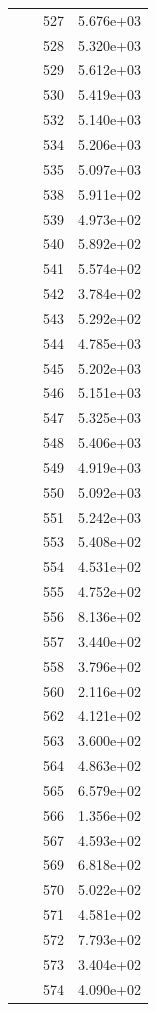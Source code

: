 \documentclass[12pt]{article}
\begin{document}
\begin{longtable}{@{}cccc@{}}
 &  & 527 & 5.676e+03 \\
 &  & 528 & 5.320e+03 \\
 &  & 529 & 5.612e+03 \\
 &  & 530 & 5.419e+03 \\
 &  & 532 & 5.140e+03 \\
 &  & 534 & 5.206e+03 \\
 &  & 535 & 5.097e+03 \\
 &  & 538 & 5.911e+02 \\
 &  & 539 & 4.973e+02 \\
 &  & 540 & 5.892e+02 \\
 &  & 541 & 5.574e+02 \\
 &  & 542 & 3.784e+02 \\
 &  & 543 & 5.292e+02 \\
 &  & 544 & 4.785e+03 \\
 &  & 545 & 5.202e+03 \\
 &  & 546 & 5.151e+03 \\
 &  & 547 & 5.325e+03 \\
 &  & 548 & 5.406e+03 \\
 &  & 549 & 4.919e+03 \\
 &  & 550 & 5.092e+03 \\
 &  & 551 & 5.242e+03 \\
 &  & 553 & 5.408e+02 \\
 &  & 554 & 4.531e+02 \\
 &  & 555 & 4.752e+02 \\
 &  & 556 & 8.136e+02 \\
 &  & 557 & 3.440e+02 \\
 &  & 558 & 3.796e+02 \\
 &  & 560 & 2.116e+02 \\
 &  & 562 & 4.121e+02 \\
 &  & 563 & 3.600e+02 \\
 &  & 564 & 4.863e+02 \\
 &  & 565 & 6.579e+02 \\
 &  & 566 & 1.356e+02 \\
 &  & 567 & 4.593e+02 \\
 &  & 569 & 6.818e+02 \\
 &  & 570 & 5.022e+02 \\
 &  & 571 & 4.581e+02 \\
 &  & 572 & 7.793e+02 \\
 &  & 573 & 3.404e+02 \\
 &  & 574 & 4.090e+02 \\

\end{longtable}
\end{document}
